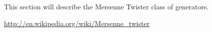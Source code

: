 This section will describe the Mersenne Twister class of generators.

\url{http://en.wikipedia.org/wiki/Mersenne_twister}
